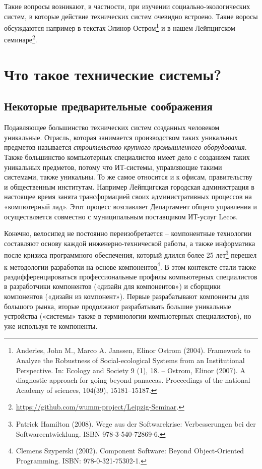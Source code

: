 \documentclass[11pt,a4paper]{article}
\begin{document}
Такие вопросы возникают, в частности, при изучении социально-экологических
систем, в которые действие технических систем очевидно встроено. Такие воросы
обсуждаются например в текстах Элинор Остром\footnote{Anderies, John M., Marco
  A. Janssen, Elinor Ostrom (2004).  Framework to Analyze the Robustness of
  Social-ecological Systems from an Institutional Perspective. In: Ecology and
  Society 9 (1), 18. -- Ostrom, Elinor (2007). A diagnostic approach for going
  beyond panaceas.  Proceedings of the national Academy of sciences, 104(39),
  15181--15187.} и в нашем Лейпцигском
семинаре\footnote{\url{https://github.com/wumm-project/Leipzig-Seminar}.}.

\section{Что такое технические системы?}

\subsection{Некоторые предварительные соображения}

Подавляющее большинство технических систем созданных человеком уникальные.
Отрасль, которая занимается производством таких уникальных предметов
называется \emph{строительство крупного промышленного оборудования}. Также
большинство компьютерных специалистов имеет дело с созданием таких уникальных
предметов, потому что ИТ-системы, управляющие такими системами, также
уникальны. То же самое относится и к офисам, правительству и общественным
институтам. Например Лейпцигская городская администрация в настоящее время
занята трансформацией своих административных процессов на «компютерный лад».
Этот процесс возглавляет Департамент общего управления и осуществляется
совместно с муниципальным поставщиком ИТ-услуг Lecos.

Конечно, велосипед не постоянно переизобретается -- компонентные технологии
составляют основу каждой инженерно-технической работы, а также информатика
после кризиса программного обеспечения, который длился более 25
лет\footnote{Patrick Hamilton (2008). Wege aus der Softwarekrise:
  Verbesserungen bei der Softwareentwicklung.  ISBN 978-3-540-72869-6.}
перешел к методологии разработки на основе компонентов\footnote{Clemens
  Szyperski (2002). Component Software: Beyond Object-Oriented
  Programming. ISBN: 978-0-321-75302-1.}.  В этом контексте стали также
раздифференцироваться профессиональные профилы компьютерных специалистов в
разработчики компонентов («дизайн для компонентов») и сборщики компонентов
(«дизайн из компонент»). Первые разрабатывают компоненты для большого рынка,
вторые продолжают разрабатывать большие уникальные устройства («системы» также в
терминологии компьютерных специалистов), но уже используя те компоненты.
\end{document}
